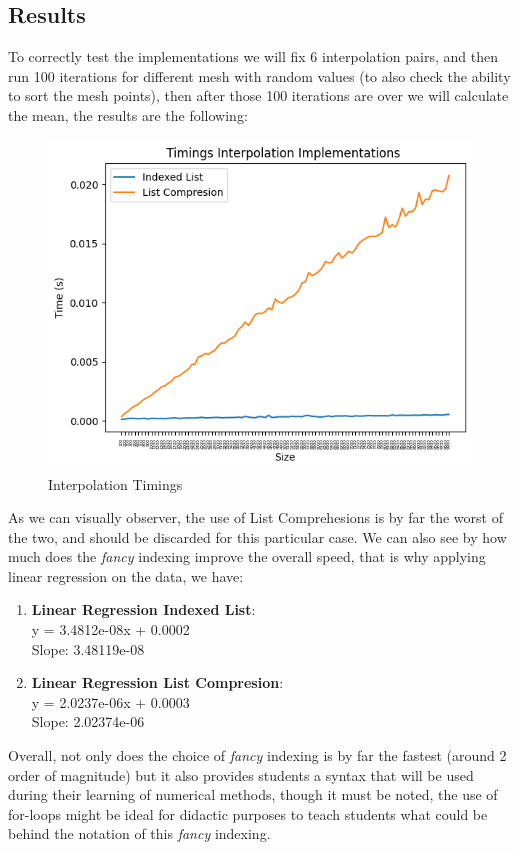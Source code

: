 \subsection{Results}
To correctly test the implementations we will fix 6 interpolation pairs, and then run 100 iterations for different mesh with random values (to also check the ability to sort the mesh points), then after those 100 iterations are over we will calculate the mean, the results are the following:
\begin{figure}[H]
    \centering
    \includegraphics[scale=0.9]{Include/Images/Thesis/Analysis of Solutions/Interpolation/Interpolation Timings.png}
    \caption{Interpolation Timings}
    \label{fig:Interpolation Timings}
\end{figure}

As we can visually observer, the use of List Comprehesions is by far the worst of the two, and should be discarded for this particular case. We can also see by how much does the \textit{fancy} indexing improve the overall speed, that is why applying linear regression on the data, we have:
\begin{enumerate}
    \item \textbf{Linear Regression Indexed List}: \\
        y = 3.4812e-08x + 0.0002 \\
        Slope: 3.48119e-08
    \item \textbf{Linear Regression List Compresion}: \\
        y = 2.0237e-06x + 0.0003 \\
        Slope: 2.02374e-06
\end{enumerate}

Overall, not only does the choice of \textit{fancy} indexing is by far the fastest (around 2 order of magnitude) but it also provides students a syntax that will be used during their learning of numerical methods, though it must be noted, the use of for-loops might be ideal for didactic purposes to teach students what could be behind the notation of this \textit{fancy} indexing.